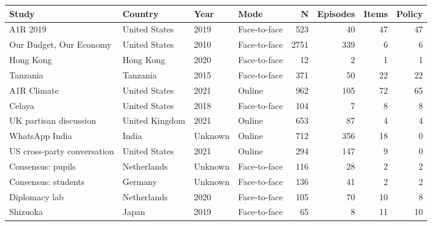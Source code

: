 
\begin{tabular}{llllrrrr}
\toprule
Study & Country & Year & Mode & N & Episodes & Items & Policy\\
\midrule
A1R 2019 & United States & 2019 & Face-to-face & 523 & 40 & 47 & 47\\
Our Budget, Our Economy & United States & 2010 & Face-to-face & 2751 & 339 & 6 & 6\\
Hong Kong & Hong Kong & 2020 & Face-to-face & 12 & 2 & 1 & 1\\
Tanzania & Tanzania & 2015 & Face-to-face & 371 & 50 & 22 & 22\\
A1R Climate & United States & 2021 & Online & 962 & 105 & 72 & 65\\
\addlinespace
Celaya & United States & 2018 & Face-to-face & 104 & 7 & 8 & 8\\
UK partisan discussion & United Kingdom & 2021 & Online & 653 & 87 & 4 & 4\\
WhatsApp India & India & Unknown & Online & 712 & 356 & 18 & 0\\
US cross-party conversation & United States & 2021 & Online & 294 & 147 & 9 & 0\\
Consensus: pupils & Netherlands & Unknown & Face-to-face & 116 & 28 & 2 & 2\\
\addlinespace
Consensus: students & Germany & Unknown & Face-to-face & 136 & 41 & 2 & 2\\
Diplomacy lab & Netherlands & 2020 & Face-to-face & 105 & 70 & 10 & 8\\
Shizuoka & Japan & 2019 & Face-to-face & 65 & 8 & 11 & 10\\
\bottomrule
\end{tabular}
